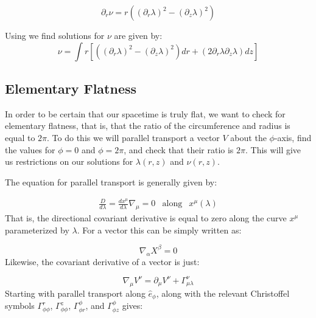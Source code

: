 \documentclass{article}
\begin{document}
\begin{equation}
\partial_{r}\nu=r\left(\left(\partial_{r}\lambda\right)^{2}-\left(\partial_{z}\lambda\right)^{2}\right)\label{eq:nu_r}
\end{equation}

Using  we find solutions for $\nu$ are given by:
\begin{equation}
\nu=\int r[\left(\left(\partial_{r}\lambda\right)^{2}-\left(\partial_{z}\lambda\right)^{2}\right)dr+\left(2\partial_{r}\lambda\partial_{z}\lambda\right)dz]\label{eq:nu}
\end{equation}

\subsection{Elementary Flatness}

In order to be certain that our spacetime is truly flat, we want to check for elementary flatness, that is, that the ratio of the circumference and radius is equal to $2\pi$. To do this we will parallel transport a vector $V$ about the $\phi$-axis, find the values for $\phi=0$ and $\phi=2\pi$, and check that their ratio is $2\pi$. This will give us restrictions on our solutions for $\lambda\left(r,z\right)$ and $\nu\left(r,z\right)$.

The equation for parallel transport is generally given by:
  	
\begin{equation}
\begin{array}{rcl} \frac{D}{d\lambda}=\frac{dx^{\mu}}{d\lambda}\nabla_{\mu}=0 & \mbox{along} & x^{\mu}\left(\lambda\right)	  	
\end{array}
\end{equation}	  	
That is, the directional covariant derivative is equal to zero along the curve $x^{\mu}$ parameterized by $\lambda$. For a vector this can be simply written as:
	  	
\begin{equation}
\nabla_{\alpha}X^{\beta}=0\label{eq:x-par-xport}
\end{equation}
Likewise, the covariant derivative of a vector is just:

\begin{equation}
\nabla_\mu V^{\nu}=\partial_\mu V^\nu+\Gamma^\nu_{\mu\lambda}
\end{equation}	  	
Starting with parallel transport along $\hat{e}_{\phi}$,  along with the relevant Christoffel symbols $\Gamma^{r}_{\phi\phi}$, $\Gamma^{z}_{\phi\phi}$, $\Gamma^{\phi}_{\phi r}$, and $\Gamma^{\phi}_{\phi z}$ gives:
	  	
\end{document}
